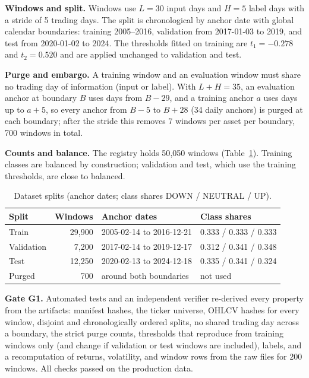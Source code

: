 \documentclass[10pt,journal,compsoc]{IEEEtran}
\begin{document}
\textbf{Windows and split.} Windows use $L=30$ input days and $H=5$ label days with a stride of 5 trading days. The split is chronological by anchor date with global calendar boundaries: training 2005--2016, validation from 2017-01-03 to 2019, and test from 2020-01-02 to 2024. The thresholds fitted on training are $t_1 = -0.278$ and $t_2 = 0.520$ and are applied unchanged to validation and test.

\textbf{Purge and embargo.} A training window and an evaluation window must share no trading day of information (input or label). With $L + H = 35$, an evaluation anchor at boundary $B$ uses days from $B-29$, and a training anchor $a$ uses days up to $a+5$, so every anchor from $B-5$ to $B+28$ (34 daily anchors) is purged at each boundary; after the stride this removes 7 windows per asset per boundary, 700 windows in total.

\textbf{Counts and balance.} The registry holds 50{,}050 windows (Table~\ref{tab:data}). Training classes are balanced by construction; validation and test, which use the training thresholds, are close to balanced.

\begin{table}[t]
\centering
\footnotesize
\caption{Dataset splits (anchor dates; class shares DOWN / NEUTRAL / UP).}
\label{tab:data}
\begin{tabular}{@{}lrll@{}}
\toprule
Split & Windows & Anchor dates & Class shares \\
\midrule
Train & 29{,}900 & 2005-02-14 to 2016-12-21 & 0.333 / 0.333 / 0.333 \\
Validation & 7{,}200 & 2017-02-14 to 2019-12-17 & 0.312 / 0.341 / 0.348 \\
Test & 12{,}250 & 2020-02-13 to 2024-12-18 & 0.335 / 0.341 / 0.324 \\
Purged & 700 & around both boundaries & not used \\
\bottomrule
\end{tabular}
\end{table}

\textbf{Gate G1.} Automated tests and an independent verifier re-derived every property from the artifacts: manifest hashes, the ticker universe, OHLCV hashes for every window, disjoint and chronologically ordered splits, no shared trading day across a boundary, the strict purge counts, thresholds that reproduce from training windows only (and change if validation or test windows are included), labels, and a recomputation of returns, volatility, and window rows from the raw files for 200 windows. All checks passed on the production data.
\end{document}
